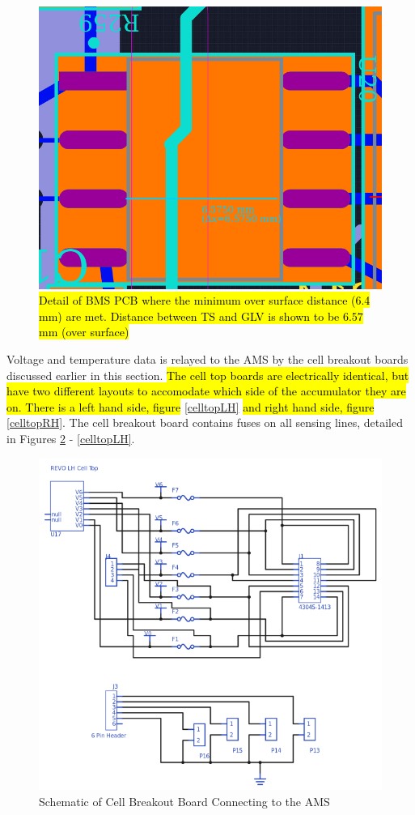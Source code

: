 \documentclass{article}
\DeclareRobustCommand{\hlr}[1]{{\sethlcolor{red}\hl{#1}}}
\begin{document}
            
            \begin{figure}[H]
                \centering
                \includegraphics[width=0.8 \textwidth]{bms_separation_detail}
                \caption{\hlr{Detail of BMS PCB where the minimum over surface distance (6.4 mm) are met. Distance between TS and GLV is shown to be $6.57$ mm (over surface)}}
                \label{creepage}
            \end{figure}
            
            Voltage and temperature data is relayed to the AMS by the cell breakout boards discussed earlier in this section. \hlr{The cell top boards are electrically identical, but have two different layouts to accomodate which side of the accumulator they are on. There is a left hand side, figure} \ref{celltopLH}\hlr{ and right hand side, figure} \ref{celltopRH}. The cell breakout board contains fuses on all sensing lines, detailed in Figures \ref{celltopschem} - \ref{celltopLH}.
            
            \begin{figure}[H]
                \centering
                \includegraphics[width = 0.4 \textwidth]{CellTopSchem}
                \caption{Schematic of Cell Breakout Board Connecting to the AMS}
                \label{celltopschem}
            \end{figure}
            
\end{document}
